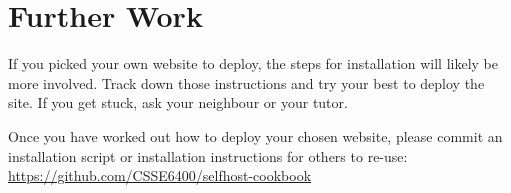 \documentclass{csse4400}
\begin{document}


\section{Further Work}
If you picked your own website to deploy, the steps for installation will likely be more involved.
Track down those instructions and try your best to deploy the site.
If you get stuck, ask your neighbour or your tutor.

Once you have worked out how to deploy your chosen website,
please commit an installation script or installation instructions for others to re-use:
\url{https://github.com/CSSE6400/selfhost-cookbook}



\end{document}
